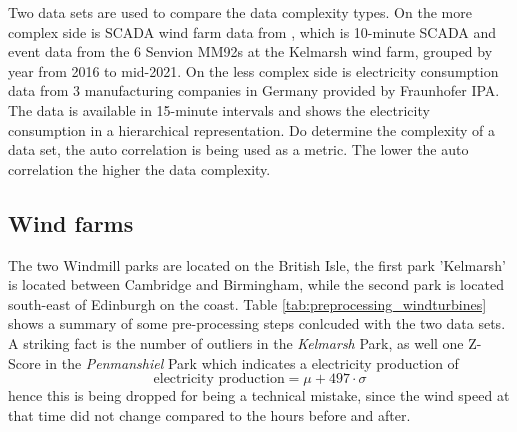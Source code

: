 \documentclass{article}
\begin{document}
Two data sets are used to compare the data complexity types. On the more complex side is SCADA wind farm data from \cite{Windpark_Data_1}, which is 10-minute SCADA and event data from the 6 Senvion MM92s at the Kelmarsh wind farm, grouped by year from 2016 to mid-2021. On the less complex side is electricity consumption data from 3 manufacturing companies in Germany provided by Fraunhofer IPA. The data is available in 15-minute intervals and shows the electricity consumption in a hierarchical representation.
Do determine the complexity of a data set, the auto correlation is being used as a metric. The lower the auto correlation the higher the data complexity. 

\subsection{Wind farms}

The two Windmill parks are located on the British Isle, the first park 'Kelmarsh' is located between Cambridge and Birmingham, while the second park is located south-east of Edinburgh on the coast. 
Table \ref{tab:preprocessing_windturbines} shows a summary of some pre-processing steps conlcuded with the two data sets. A striking fact is the number of outliers in the \textit{Kelmarsh} Park, as well one Z-Score in the \textit{Penmanshiel} Park which indicates a electricity production of
\begin{equation*}
    \text{electricity production} = \mu + 497 \cdot \sigma
\end{equation*}
hence this is being dropped for being a technical mistake, since the wind speed at that time did not change compared to the hours before and after. 
\end{document}
